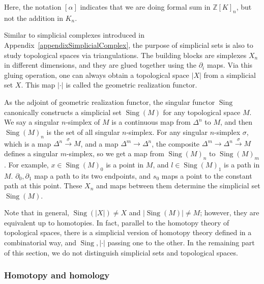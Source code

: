 \documentclass[reprint, amsmath, amssymb, showpacs, floatfix, longbibliography, aps, twocolumn, superscriptaddress, nofootinbib]{revtex4-2}
\newcommand{\ZZ}{{\mathbb Z}}
\theoremstyle{definition}
\begin{document}
Here, the notation $[\alpha]$ indicates that we are doing formal sum in $\ZZ[K]_n$, but not the addition in $K_n$.

Similar to simplicial complexes introduced in Appendix~\ref{appendixSimplicialComplex}, the purpose of simplicial sets is also to study topological spaces via triangulations. The building blocks are simplexes $X_n$ in different dimensions, and they are glued together using the $\partial_i$ maps. Via this gluing operation, one can always obtain a topological space $|X|$ from a simplicial set $X$. This map $|\cdot|$ is called the geometric realization functor. 




As the adjoint of geometric realization functor, the singular functor $\operatorname{Sing}$ canonically constructs a simplicial set $\operatorname{Sing}(M)$ for any topological space $M$. We say a singular $n$-simplex of $M$ is a continuous map from $\Delta^n$ to $M$, and then $\operatorname{Sing}(M)_n$ is the set of all singular $n$-simplex. For any singular $n$-simplex $\sigma$, which is a map $\Delta^n\xrightarrow{\sigma}M$, and a map $\Delta^m\rightarrow \Delta^n$, the composite $\Delta^m\rightarrow\Delta^n\xrightarrow{\sigma}M$ defines a singular $m$-simplex, so we get a map from $\operatorname{Sing}(M)_n$ to $\operatorname{Sing}(M)_m$. For example,  $x\in \operatorname{Sing}(M)_0$ is a point in $M$, and $l\in \operatorname{Sing}(M)_1$ is a path in $M$. $\partial_0,\partial_1$ map a path to its two endpoints, and $s_0$ maps a point to the constant path at this point. These $X_n$ and maps between them determine the simplicial set $\operatorname{Sing}(M)$.


Note that in general, $\operatorname{Sing}(|X|)\ne X$ and $|\operatorname{Sing}(M)|\ne M$; however, they are equivalent up to homotopies. In fact,
parallel to the homotopy theory of topological spaces, there is a simplicial version of homotopy theory defined in a combinatorial way, and $\operatorname{Sing},|\cdot|$ passing one to the other. In the remaining part of this section, we do not distinguish simplicial sets and topological spaces. 

\subsubsection*{Homotopy and homology}
\end{document}
